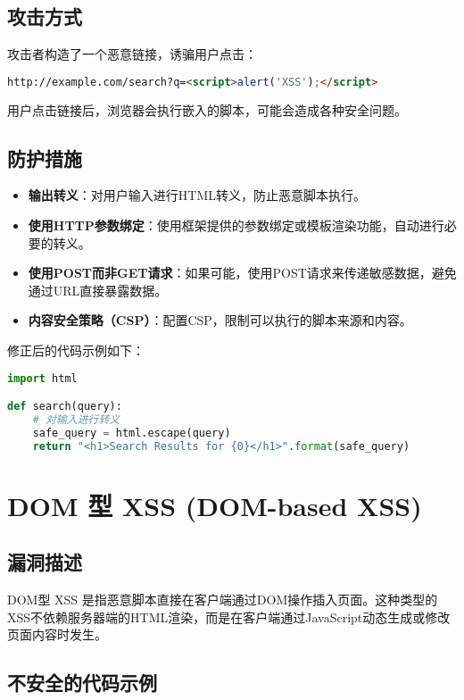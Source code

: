 \documentclass{article}
\begin{document}
\subsection{攻击方式}
攻击者构造了一个恶意链接，诱骗用户点击：

\begin{lstlisting}[language=HTML, caption=恶意链接]
http://example.com/search?q=<script>alert('XSS');</script>
\end{lstlisting}

用户点击链接后，浏览器会执行嵌入的脚本，可能会造成各种安全问题。

\subsection{防护措施}
\begin{itemize}
    \item \textbf{输出转义}：对用户输入进行HTML转义，防止恶意脚本执行。
    \item \textbf{使用HTTP参数绑定}：使用框架提供的参数绑定或模板渲染功能，自动进行必要的转义。
    \item \textbf{使用POST而非GET请求}：如果可能，使用POST请求来传递敏感数据，避免通过URL直接暴露数据。
    \item \textbf{内容安全策略（CSP）}：配置CSP，限制可以执行的脚本来源和内容。
\end{itemize}

修正后的代码示例如下：

\begin{lstlisting}[language=Python, caption=反射型 XSS 的安全代码示例]
import html

def search(query):
    # 对输入进行转义
    safe_query = html.escape(query)
    return "<h1>Search Results for {0}</h1>".format(safe_query)
\end{lstlisting}

\section{DOM 型 XSS (DOM-based XSS)}

\subsection{漏洞描述}
DOM型 XSS 是指恶意脚本直接在客户端通过DOM操作插入页面。这种类型的XSS不依赖服务器端的HTML渲染，而是在客户端通过JavaScript动态生成或修改页面内容时发生。

\subsection{不安全的代码示例}
\end{document}

